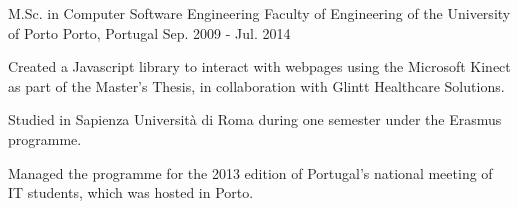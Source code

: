 \documentclass[11pt, a4paper]{awesome-cv}
\begin{document}


\begin{cventries}

  \cventry
    {M.Sc. in Computer Software Engineering} %
    {Faculty of Engineering of the University of Porto} %
    {Porto, Portugal} %
    {Sep. 2009 - Jul. 2014} %
    {
      \begin{cvitems} %
        \item {Created a Javascript library to interact with webpages using the Microsoft Kinect as part of the Master's Thesis, in collaboration with Glintt Healthcare Solutions.}
        \item {Studied in Sapienza Università di Roma during one semester under the Erasmus programme.}
        \item {Managed the programme for the 2013 edition of Portugal's national meeting of IT students, which was hosted in Porto.}
      \end{cvitems}
    }

\end{cventries}


\end{document}
